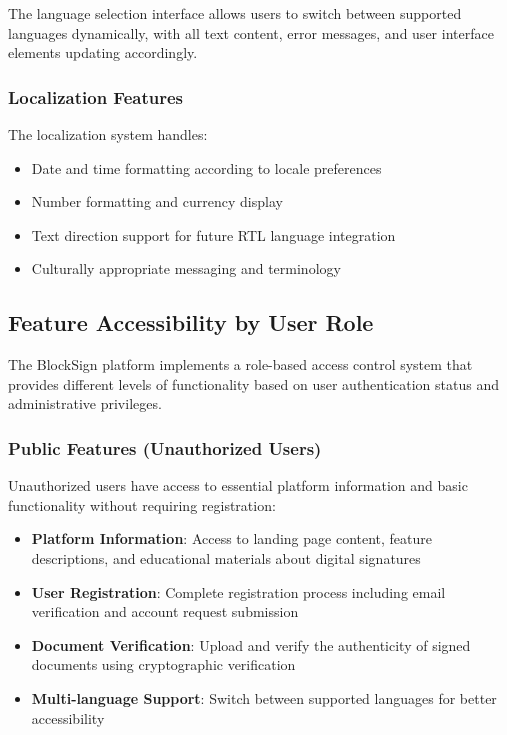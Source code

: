 The language selection interface allows users to switch between supported languages dynamically, with all text content, error messages, and user interface elements updating accordingly.

\subsubsection{Localization Features}
The localization system handles:
\begin{itemize}
    \item Date and time formatting according to locale preferences
    \item Number formatting and currency display
    \item Text direction support for future RTL language integration
    \item Culturally appropriate messaging and terminology
\end{itemize}

\subsection{Feature Accessibility by User Role}

The BlockSign platform implements a role-based access control system that provides different levels of functionality based on user authentication status and administrative privileges.

\subsubsection{Public Features (Unauthorized Users)}
Unauthorized users have access to essential platform information and basic functionality without requiring registration:

\begin{itemize}
    \item \textbf{Platform Information}: Access to landing page content, feature descriptions, and educational materials about digital signatures
    \item \textbf{User Registration}: Complete registration process including email verification and account request submission
    \item \textbf{Document Verification}: Upload and verify the authenticity of signed documents using cryptographic verification
    \item \textbf{Multi-language Support}: Switch between supported languages for better accessibility
\end{itemize}

